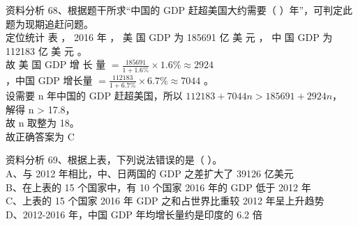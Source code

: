 \documentclass[aspectratio=169]{beamer}
\begin{document}
\begin{frame}[t]{资料分析}
    68、根据题干所求“中国的 GDP 赶超美国大约需要（ ）年”，可判定此题为现期追赶问题。\\
    定位统计 表 ， 2016 年 ， 美 国 GDP 为 185691 亿 美 元 ， 中 国 GDP 为 112183 亿 美 元 。\\
    故 美 国 GDP 增 长 量 $= \frac{185691}{1+1.6\%} \times 1.6\% \approx 2924$\\
    ，中国 GDP 增长量 $=\frac{112183}{1+6.7\%} \times 6.7\% \approx 7044$ 。\\
    设需要 n 年中国的 GDP 赶超美国，所以 $112183 + 7044n > 185691 + 2924n$，\\
    解得 n > 17.8，\\
    故 n 取整为 18。\\
    故正确答案为 C
\end{frame}                           




\begin{frame}[t]{资料分析}
    69、根据上表，下列说法错误的是（ ）。                               \\
    A、与 2012 年相比，中、日两国的 GDP 之差扩大了 39126 亿美元         \\
    B、在上表的 15 个国家中，有 10 个国家 2016 年的 GDP 低于 2012 年    \\
    C、上表的 15 个国家 2016 年 GDP 之和占世界比重较 2012 年呈上升趋势  \\
    D、2012-2016 年，中国 GDP 年均增长量约是印度的 6.2 倍               \\
\end{frame}                           
\end{document}
